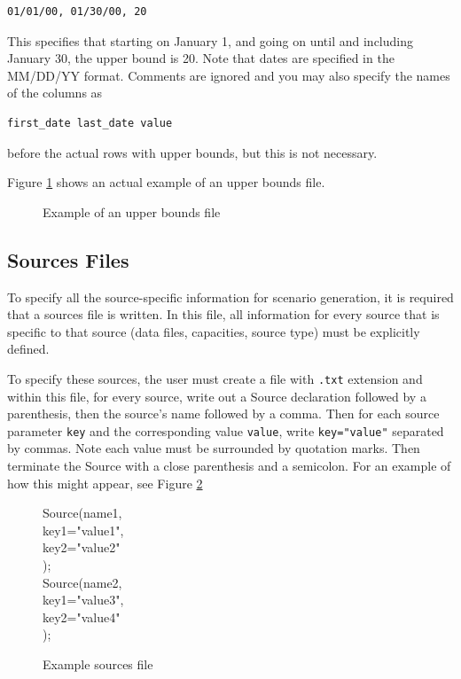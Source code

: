 \documentclass[11pt]{article}
\begin{document}
\begin{verbatim}
01/01/00, 01/30/00, 20
\end{verbatim}	
This specifies that starting on January 1, and going on until and including January 30, the upper bound is 20. Note that dates are specified in the MM/DD/YY format. Comments are ignored and you may also specify the names of the columns as

\begin{verbatim}
first_date last_date value
\end{verbatim}
before the actual rows with upper bounds, but this is not necessary.

Figure \ref{fig:upperbounds} shows an actual example of an upper bounds file.

\begin{figure}[H]
	\begin{framed}
		
	\end{framed}
	\caption{Example of an upper bounds file}
	\label{fig:upperbounds}
\end{figure}

\subsection{Sources Files}
To specify all the source-specific information for scenario generation, it is required
that a sources file is written. In this file, all information for every source that is specific
to that source (data files, capacities, source type) must be explicitly defined.

To specify these sources, the user must create a file with \texttt{.txt} extension and within
this file, for every source, write out a Source declaration followed by a parenthesis, then the source's name followed by a comma. 
Then for each source parameter \texttt{key} and the corresponding value \texttt{value}, write \texttt{key="value"} separated by commas.
Note each value must be surrounded by quotation marks. Then terminate the Source with a close parenthesis and a semicolon.
For an example of how this might appear, see Figure \ref{fig:sources}

\begin{figure}[H]
	\begin{framed}
		Source(name1, \\
		key1="value1", \\
		key2="value2" \\
		);\\
		Source(name2,\\
		key1="value3", \\
		key2="value4"\\
		);
	\end{framed}
	\caption{Example sources file}
	\label{fig:sources}
\end{figure}
\end{document}
